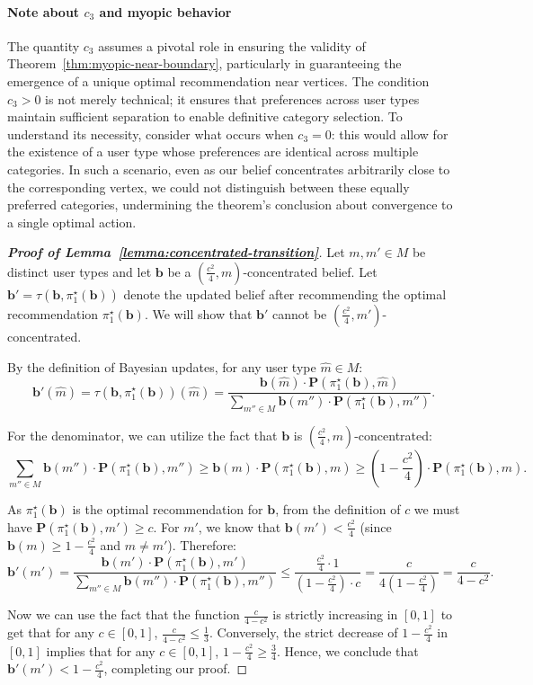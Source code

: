 \paragraph{Note about $c_3$ and myopic behavior} The quantity $c_3$ assumes a pivotal role in ensuring the validity of Theorem~\ref{thm:myopic-near-boundary}, particularly in guaranteeing the emergence of a unique optimal recommendation near vertices. The condition $c_3 > 0$ is not merely technical; it ensures that preferences across user types maintain sufficient separation to enable definitive category selection. To understand its necessity, consider what occurs when $c_3 = 0$: this would allow for the existence of a user type whose preferences are identical across multiple categories. In such a scenario, even as our belief concentrates arbitrarily close to the corresponding vertex, we could not distinguish between these equally preferred categories, undermining the theorem's conclusion about convergence to a single optimal action. 

\begin{proof}[\normalfont\bfseries Proof of Lemma~\ref{lemma:concentrated-transition}]
Let $m, m' \in M$ be distinct user types and let $\bm{b}$ be a $(\frac{c^2}{4},m)$-concentrated belief. Let $\bm{b}' = \tau(\bm{b}, \pi^\star_1(\bm b))$ denote the updated belief after recommending the optimal recommendation $\pi^\star_1(\bm b)$. We will show that $\bm{b}'$ cannot be $(\frac{c^2}{4},m')$-concentrated.

By the definition of Bayesian updates, for any user type $\hat{m} \in M$:
\[
   \bm{b}'(\hat{m}) = \tau(\bm{b}, \pi^\star_1(\bm b))(\hat{m}) = \frac{\bm{b}(\hat{m}) \cdot \bm{P}(\pi^\star_1(\bm b), \hat{m})}{\sum_{m'' \in M} \bm{b}(m'') \cdot \bm{P}(\pi^\star_1(\bm b), m'')}.
\]

For the denominator, we can utilize the fact that $\bm{b}$ is $(\frac{c^2}{4},m)$-concentrated:
\[
   \sum_{m'' \in M} \bm{b}(m'') \cdot \bm{P}(\pi^\star_1(\bm b), m'') \geq \bm{b}(m) \cdot \bm{P}(\pi^\star_1(\bm b), m) \geq \left(1 - \frac{c^2}{4}\right) \cdot \bm{P}(\pi^\star_1(\bm b), m).
\]

As $\pi^\star_1(\bm b)$ is the optimal recommendation for $\bm b$, from the definition of $c$ we must have $\bm{P}(\pi^\star_1(\bm b), m') \geq c$. For $m'$, we know that $\bm{b}(m') < \frac{c^2}{4}$ (since $\bm{b}(m) \geq 1 - \frac{c^2}{4}$ and $m \neq m'$). Therefore:
\[
   \bm{b}'(m') = \frac{\bm{b}(m') \cdot \bm{P}(\pi^\star_1(\bm b), m')}{\sum_{m'' \in M} \bm{b}(m'') \cdot \bm{P}(\pi^\star_1(\bm b), m'')} \leq \frac{\frac{c^2}{4} \cdot 1}{\left(1 - \frac{c^2}{4}\right) \cdot c} = \frac{c}{4(1 - \frac{c^2}{4})} = \frac{c}{4 - c^2}.
\]

Now we can use the fact that the function $\frac{c}{4 - c^2}$ is strictly increasing in $[0,1]$ to get that for any $c \in [0,1]$, $\frac{c}{4 - c^2} \leq \frac{1}{3}$. Conversely, the strict decrease of $1 - \frac{c^2}{4}$ in $[0,1]$ implies that for any $c \in [0,1]$, $1 - \frac{c^2}{4} \geq \frac{3}{4}$. Hence, we conclude that $\bm{b}'(m') < 1 - \frac{c^2}{4}$, completing our proof.
\end{proof}

